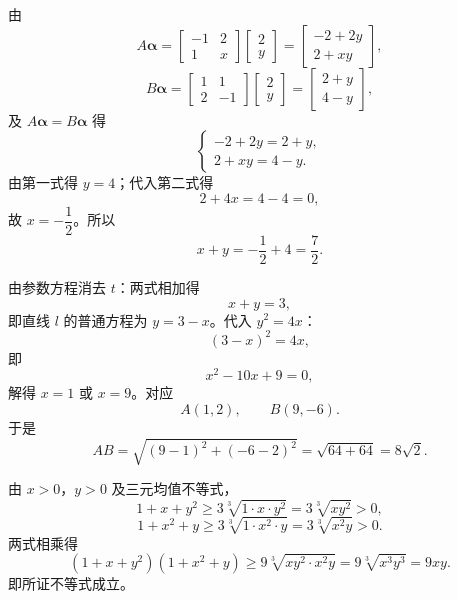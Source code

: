 \begin{answer}
由
\nopagebreak[4]
\[A\boldsymbol\alpha=\begin{bmatrix}-1&2\\1&x\end{bmatrix}\begin{bmatrix}2\\y\end{bmatrix}
=\begin{bmatrix}-2+2y\\2+xy\end{bmatrix},\]
\nopagebreak[4]
\[B\boldsymbol\alpha=\begin{bmatrix}1&1\\2&-1\end{bmatrix}\begin{bmatrix}2\\y\end{bmatrix}
=\begin{bmatrix}2+y\\4-y\end{bmatrix},\]
及 $A\boldsymbol\alpha=B\boldsymbol\alpha$ 得
\nopagebreak[4]
\[\begin{cases}-2+2y=2+y,\\2+xy=4-y.\end{cases}\]
由第一式得 $y=4$；代入第二式得
\nopagebreak[4]
\[2+4x=4-4=0,\]
故 $x=-\dfrac12$。所以
\nopagebreak[4]
\[x+y=-\frac12+4=\frac72.\]


由参数方程消去 $t$：两式相加得
\nopagebreak[4]
\[x+y=3,\]
即直线 $l$ 的普通方程为 $y=3-x$。代入 $y^2=4x$：
\nopagebreak[4]
\[(3-x)^2=4x,\]
即
\nopagebreak[4]
\[x^2-10x+9=0,\]
解得 $x=1$ 或 $x=9$。对应
\nopagebreak[4]
\[A(1,2),\qquad B(9,-6).\]
于是
\nopagebreak[4]
\[AB=\sqrt{(9-1)^2+(-6-2)^2}=\sqrt{64+64}=8\sqrt2.\]


由 $x>0$，$y>0$ 及三元均值不等式，
\nopagebreak[4]
\[1+x+y^2\geqslant3\sqrt[3]{1\cdot x\cdot y^2}=3\sqrt[3]{xy^2}>0,\]
\nopagebreak[4]
\[1+x^2+y\geqslant3\sqrt[3]{1\cdot x^2\cdot y}=3\sqrt[3]{x^2y}>0.\]
两式相乘得
\nopagebreak[4]
\[(1+x+y^2)(1+x^2+y)\geqslant9\sqrt[3]{xy^2\cdot x^2y}=9\sqrt[3]{x^3y^3}=9xy.\]
即所证不等式成立。





\end{answer}

